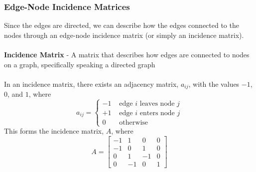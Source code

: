 \subsubsection{Edge-Node Incidence Matrices}
Since the edges are directed, we can describe how the edges connected 
to the nodes through an edge-node incidence matrix (or simply an incidence matrix). \\\\
\textbf{Incidence Matrix} - A matrix that describes how edges are connected to nodes on a graph, specifically speaking a directed graph \\\\ 
In an incidence matrix, there exists an adjacency matrix, $a_{ij}$, 
with the values $-1$, $0$, and $1$, where
\[
  a_{ij} = \begin{cases}
    -1 & \text{ edge $i$ leaves node $j$} \\
    +1 & \text{ edge $i$ enters node $j$} \\
    0 & \text{ otherwise}
  \end{cases}
\]
This forms the incidence matrix, $A$, where 
\[
  A = \begin{bmatrix}
    -1 & 1 & 0 & 0 \\
    -1 & 0 & 1 & 0 \\
    0 & 1 & -1 & 0 \\
    0 & -1 & 0 & 1
  \end{bmatrix}
\]

